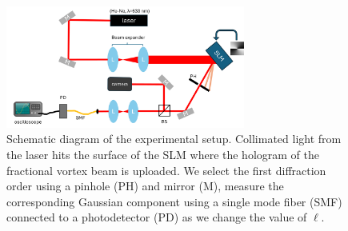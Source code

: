 \documentclass[10pt,a4paper,twoside]{article}
\renewcommand{\l}{\ell}
\begin{document}
\begin{figure}[h!]
    \centering
    \includegraphics[width=0.7\textwidth]{setup.png}
    \caption{Schematic diagram of the experimental setup. Collimated light from the laser hits the surface of the SLM where the hologram of the fractional vortex beam is uploaded. We select the first diffraction order using a pinhole (PH) and mirror (M),  measure the corresponding Gaussian component using a single mode fiber (SMF) connected to a photodetector (PD) as we change the value of $\l$. } 
    \label{fig:setup}
\end{figure}
\end{document}
